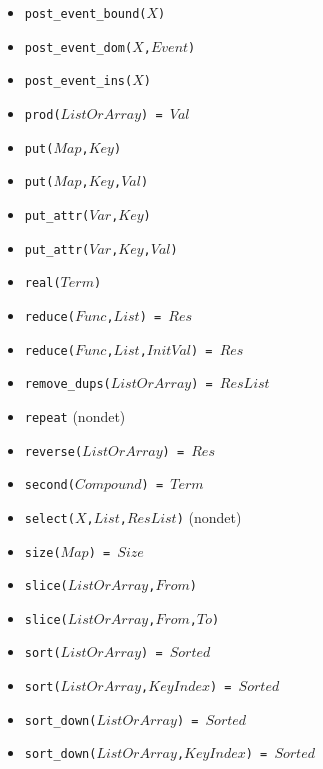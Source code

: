 \documentclass[10pt]{article}
\begin{document}
\begin{multicols}{2}
\begin{scriptsize}
\begin{itemize}
    \item \texttt{post\_event\_bound($X$)}
    \item \texttt{post\_event\_dom($X$,$Event$)}
    \item \texttt{post\_event\_ins($X$)}
    \item \texttt{prod($ListOrArray$) = $Val$}
    \item \texttt{put($Map$,$Key$)} 
    \item \texttt{put($Map$,$Key$,$Val$)} 
    \item \texttt{put\_attr($Var$,$Key$)} 
    \item \texttt{put\_attr($Var$,$Key$,$Val$)} 
    \item \texttt{real($Term$)} 
    \item \texttt{reduce($Func$,$List$) = $Res$} 
    \item \texttt{reduce($Func$,$List$,$InitVal$) = $Res$} 
    \item \texttt{remove\_dups($ListOrArray$) = $ResList$} 
    \item \texttt{repeat} (nondet)
    \item \texttt{reverse($ListOrArray$) = $Res$} 
    \item \texttt{second($Compound$) = $Term$} 
    \item \texttt{select($X$,$List$,$ResList$)} (nondet)
    \item \texttt{size($Map$) = $Size$}
    \item \texttt{slice($ListOrArray$,$From$)}
    \item \texttt{slice($ListOrArray$,$From$,$To$)}
    \item \texttt{sort($ListOrArray$) = $Sorted$} 
    \item \texttt{sort($ListOrArray$,$KeyIndex$) = $Sorted$} 
    \item \texttt{sort\_down($ListOrArray$) = $Sorted$} 
    \item \texttt{sort\_down($ListOrArray$,$KeyIndex$) = $Sorted$} 

\end{itemize}
\end{scriptsize}
\end{multicols}
\end{document}
